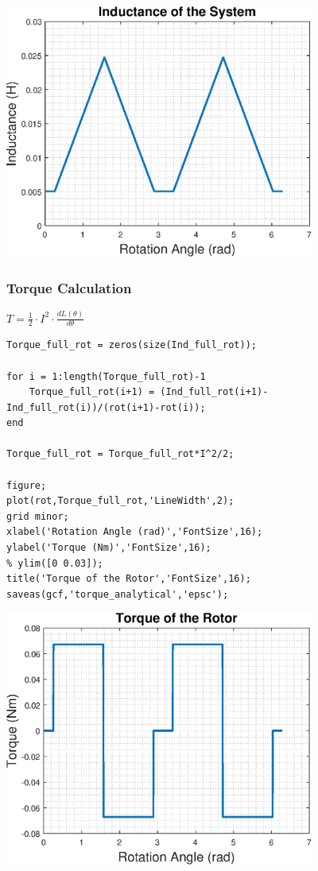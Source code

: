 \begin{center}

\includegraphics [width=4in]{html/analytical_02.eps}

\end{center}

\subsubsection*{Torque Calculation}

\begin{par}
$T = \frac{1}{2}\cdot I^2\cdot\frac{dL(\theta)}{d\theta}$
\end{par} \vspace{1em}
\begin{verbatim}
Torque_full_rot = zeros(size(Ind_full_rot));

for i = 1:length(Torque_full_rot)-1
    Torque_full_rot(i+1) = (Ind_full_rot(i+1)-Ind_full_rot(i))/(rot(i+1)-rot(i));
end

Torque_full_rot = Torque_full_rot*I^2/2;

figure;
plot(rot,Torque_full_rot,'LineWidth',2);
grid minor;
xlabel('Rotation Angle (rad)','FontSize',16);
ylabel('Torque (Nm)','FontSize',16);
% ylim([0 0.03]);
title('Torque of the Rotor','FontSize',16);
saveas(gcf,'torque_analytical','epsc');
\end{verbatim}

\begin{center}

\includegraphics [width=4in]{html/analytical_03.eps}

\end{center}

